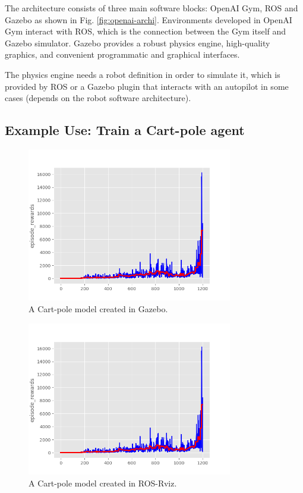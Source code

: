 The architecture consists of three main software blocks: OpenAI Gym, ROS and Gazebo as shown in Fig. \ref{fig:openai-archi}. Environments developed in OpenAI Gym interact with ROS, which is the connection between the Gym itself and Gazebo simulator. Gazebo provides a robust physics engine, high-quality graphics, and convenient programmatic and graphical interfaces.

The physics engine needs a robot definition in order to simulate it, which is provided by ROS or a Gazebo plugin that interacts with an autopilot in some cases (depends on the robot software architecture).

\subsection{Example Use: Train a Cart-pole agent}

\begin{figure}[h]
\centering
\includegraphics[width=0.8\textwidth]{figs/ch2/cartpole-epoch-1200}
\caption{A Cart-pole model created in Gazebo.}
\label{fig:cartpole-in-gazebo}
\end{figure}

\begin{figure}[h]
\centering
\includegraphics[width=0.8\textwidth]{figs/ch2/cartpole-epoch-1200}
\caption{A Cart-pole model created in ROS-Rviz.}
\label{fig:cartpole-in-rviz}
\end{figure}

